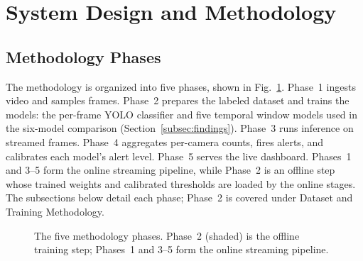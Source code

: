 \documentclass[conference]{IEEEtran}
\begin{document}
\section{System Design and Methodology}

\subsection{Methodology Phases}
\label{subsec:phases}

The methodology is organized into five phases, shown in
Fig.~\ref{fig:methodology-phases}. Phase~1 ingests video and samples
frames. Phase~2 prepares the labeled dataset and trains the models: the
per-frame YOLO classifier and five temporal window models used in the
six-model comparison (Section~\ref{subsec:findings}). Phase~3 runs
inference on streamed frames. Phase~4 aggregates per-camera counts, fires
alerts, and calibrates each model's alert level. Phase~5 serves the live
dashboard. Phases~1 and 3--5 form the online streaming pipeline, while
Phase~2 is an offline step whose trained weights and calibrated thresholds
are loaded by the online stages. The subsections below detail each phase;
Phase~2 is covered under Dataset and Training Methodology.

\begin{figure}[t]
\centering
{}
\caption{The five methodology phases. Phase~2 (shaded) is the offline training
step; Phases~1 and 3--5 form the online streaming pipeline.}
\label{fig:methodology-phases}
\end{figure}
\end{document}
